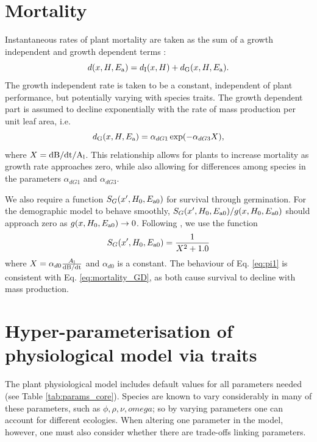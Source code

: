 \documentclass[10pt,twoside]{article}
\begin{document}
\section{Mortality}\label{mortality}

Instantaneous rates of plant mortality are taken as the sum of a growth
independent and growth dependent terms
\citep{Falster-2011, Moorcroft-2001}:
\begin{equation}\label{eq:mortality}
d(x, H, E_{\rm a}) = d_{\textrm{I}}(x, H) + d_{\textrm{G}}(x, H, E_{\rm a}).
\end{equation}
The growth independent rate is taken to be a constant, independent of
plant performance, but potentially varying with species traits. The
growth dependent part is assumed to decline exponentially with the rate
of mass production per unit leaf area, i.e.
\begin{equation}\label{eq:mortality_GD}
d_{\textrm{G}}(x, H, E_{\rm a}) = \alpha_{dG1}  \exp(-\alpha_{dG3} X),
\end{equation}
where \(X = \rm{d}B / \rm{d}t / A_\textrm{l}\). This
relationship allows for plants to increase mortality as growth rate
approaches zero, while also allowing for differences among species in
the parameters \(\alpha_{dG1}\) and \(\alpha_{dG3}\).

We also require a function \(S_G(x^\prime, H_0, E_{{\rm a}0})\) for survival
through germination. For the demographic model to behave smoothly,
\(S_G (x^\prime, H_0, E_{{\rm a}0}) / g(x, H_0, E_{{\rm a}0})\) should approach zero as
\(g(x, H_0, E_{{\rm a}0}) \rightarrow 0\). Following \citep{Falster-2011},
we use the function
\begin{equation} \label{eq:pi1}
  S_G (x^\prime, H_0, E_{{\rm a}0}) = \frac1{X^2 + 1.0}
\end{equation}
where $X = \alpha_{d0} \frac{A_{\rm l}}{\rm{d}B / \rm{d}t}$ and $\alpha_{d0}$ is a
constant. The behaviour of Eq. \ref{eq:pi1} is consistent with Eq.
\ref{eq:mortality_GD}, as both cause survival to decline with mass production.

\section{Hyper-parameterisation of physiological model via
traits}\label{traits}

The plant physiological model includes default values for all parameters needed
(see Table \ref{tab:params_core}). Species are known to vary considerably
in many of these parameters, such as $\phi,\rho, \nu, omega$; so by varying  parameters
one can account for different ecologies. When altering one parameter in the model, however,
one must also consider whether there are trade-offs linking parameters.
\end{document}

